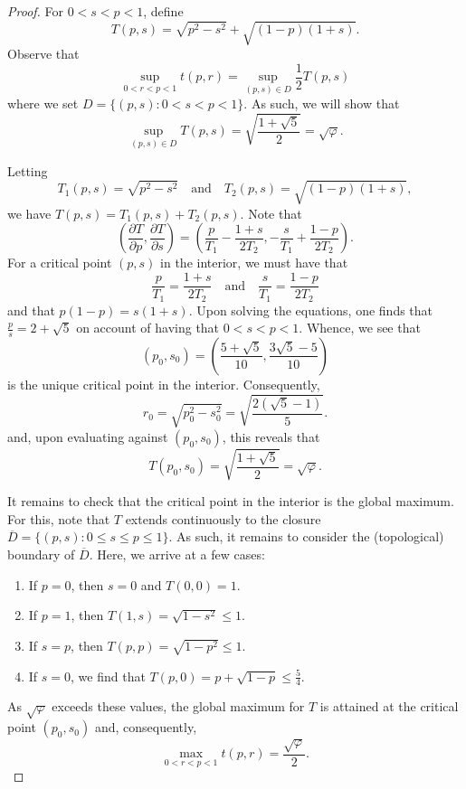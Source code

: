 \documentclass[10pt]{amsart}
\renewcommand{\phi}{\varphi}
\newcommand{\ol}{\overline}
\begin{document}
\begin{proof}
    For $0<s<p<1$, define
    \[
        T(p,s)=\sqrt{p^2-s^2}+\sqrt{(1-p)(1+s)}.
    \]
    Observe that
    \[
        \sup_{0<r<p<1} t(p,r) = \sup_{(p,s)\in D} \frac{1}{2}T(p,s)
    \]
    where we set $D=\{(p,s):0<s<p<1\}$. As such, we will show that
    \[
        \sup_{(p,s)\in D} T(p,s)=\sqrt{\frac{1+\sqrt5}{2}} = \sqrt{\phi}.
    \]

    Letting
    \[
        T_1(p,s)=\sqrt{p^2-s^2} \quad \text{and} \quad T_2(p,s)=\sqrt{(1-p)(1+s)},
    \]
    we have $T(p,s) = T_1(p,s) + T_2(p,s)$. Note that
    \[
        \left(\frac{\partial T}{\partial p},\frac{\partial T}{\partial s}\right)=\left(\frac{p}{T_1}-\frac{1+s}{2T_2}, -\frac{s}{T_1}+\frac{1-p}{2T_2}\right).
    \]
    For a critical point $(p,s)$ in the interior, we must have that
    \[
        \frac{p}{T_1}=\frac{1+s}{2T_2} \quad \text{and} \quad \frac{s}{T_1}=\frac{1-p}{2T_2}
    \]
    and that $p(1-p)=s(1+s)$. Upon solving the equations, one finds that $\frac{p}{s} = 2+\sqrt{5}$ on account of having that $0<s<p <1$. Whence, we see that
    \[
        (p_0, s_0) = \left(\frac{5+\sqrt{5}}{10}, \frac{3\sqrt{5}-5}{10}\right)
    \]
    is the unique critical point in the interior. Consequently,
    \[
        r_0 = \sqrt{p_0^2-s_0^2} = \sqrt{\frac{2(\sqrt{5}-1)}{5}}.
    \]
    and, upon evaluating against $(p_0,s_0)$, this reveals that
    \[
        T(p_0,s_0) = \sqrt{\frac{1+\sqrt{5}}{2}} = \sqrt{\phi}.
    \]

    It remains to check that the critical point in the interior is the global maximum. For this, note that $T$ extends continuously to the closure $\ol{D}=\{(p,s):0\leq s\leq p\leq1\}$. As such, it remains to consider the (topological) boundary of $\ol{D}$. Here, we arrive at a few cases:
    \begin{enumerate}[{\rm (i)}]
        \item If $p=0$, then $s=0$ and $T(0,0)= 1$.\vspace{1.5mm}
        \item If $p=1$, then $T(1,s) = \sqrt{1-s^2}\leq 1$.\vspace{1.5mm}
        \item If $s=p$, then $T(p,p) = \sqrt{1-p^2}\leq 1$.\vspace{1.5mm}
        \item If $s=0$, we find that $T(p,0) = p+\sqrt{1-p}\leq \frac{5}{4}$.\vspace{1.5mm}
    \end{enumerate}
    As $\sqrt{\phi}$ exceeds these values, the global maximum for $T$ is attained at the critical point $(p_0,s_0)$ and, consequently,
    \[
        \max_{0<r<p<1} t(p,r) = \frac{\sqrt{\phi}}{2}.
    \]
\end{proof}
\end{document}
